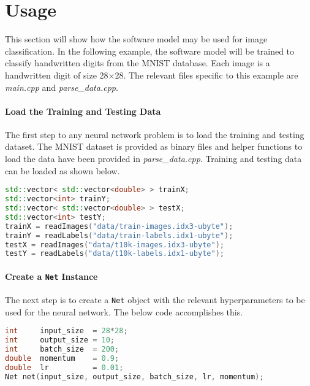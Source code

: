 \section{Usage}\label{sw-usage}
This section will show how the software model may be used for image classification. In the following example, the software model will be trained to classify handwritten digits from the MNIST database. Each image is a handwritten digit of size 28$\times$28. The relevant files specific to this example are \textit{main.cpp} and \textit{parse\_data.cpp}.
\paragraph{Load the Training and Testing Data}
The first step to any neural network problem is to load the training and testing dataset.
The MNIST dataset is provided as binary files and helper functions to load the data have been provided in \textit{parse\_data.cpp}. Training and testing data can be loaded as shown below.
\begin{lstlisting}[language=c++]
std::vector< std::vector<double> > trainX;
std::vector<int> trainY;
std::vector< std::vector<double> > testX;
std::vector<int> testY;
trainX = readImages("data/train-images.idx3-ubyte");
trainY = readLabels("data/train-labels.idx1-ubyte");
testX = readImages("data/t10k-images.idx3-ubyte");
testY = readLabels("data/t10k-labels.idx1-ubyte");
\end{lstlisting}
\paragraph{Create a \texttt{Net} Instance}
The next step is to create a \texttt{Net} object with the relevant hyperparameters to be used for the neural network. The below code accomplishes this.
\begin{lstlisting}[language=c++]
int 	input_size  = 28*28;
int     output_size = 10;
int     batch_size  = 200;
double  momentum    = 0.9;
double  lr          = 0.01; 
Net net(input_size, output_size, batch_size, lr, momentum);
\end{lstlisting}

